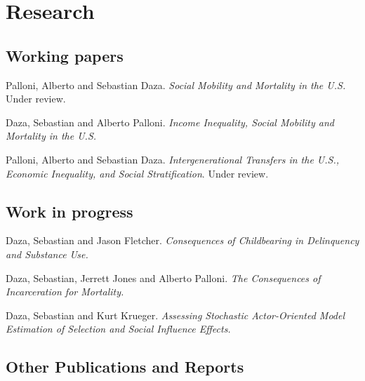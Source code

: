 \documentclass[10pt,letterpaper]{article}
\renewenvironment{itemize}{
  \begin{list}{}{
    \setlength{\leftmargin}{1.5em}
    \setlength{\itemsep}{0.25em}
    \setlength{\parskip}{0pt}
    \setlength{\parsep}{0.25em}
  }
}{
  \end{list}
}
\begin{document}
\section*{Research}

\subsection*{Working papers}

\begin{itemize}

\item Palloni, Alberto and Sebastian Daza. {\textit{Social Mobility and Mortality in the U.S.}} Under review.

\item Daza, Sebastian and Alberto Palloni. {\textit{Income Inequality, Social Mobility and Mortality in the U.S.}}

\item Palloni, Alberto and Sebastian Daza. {\textit{Intergenerational Transfers in the U.S., Economic Inequality, and Social Stratification}}.
Under review.

\end{itemize}

\subsection*{Work in progress}

\begin{itemize}

\item Daza, Sebastian and Jason Fletcher. {\textit{Consequences of Childbearing in Delinquency and Substance Use.}}

\item Daza, Sebastian, Jerrett Jones and Alberto Palloni. {\textit{The Consequences of Incarceration for Mortality.}}

\item Daza, Sebastian and Kurt Krueger. {\textit{Assessing Stochastic Actor-Oriented Model Estimation of Selection and Social Influence Effects.}}
\end{itemize}


\subsection*{Other Publications and Reports}
\end{document}

